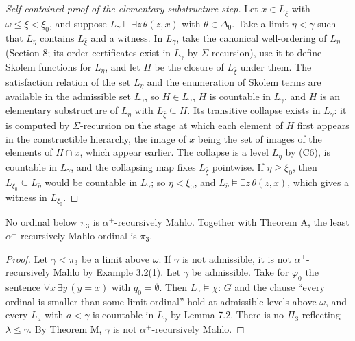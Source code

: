 \documentclass[11pt]{article}
\begin{document}
\begin{proof}[Self-contained proof of the elementary substructure step]
Let $x \in L_{\bar{\xi}}$ with $\omega \le \bar{\xi} < \xi_0$, and suppose $L_{\gamma} \models \exists z\, \theta(z, x)$
with $\theta \in \Delta_0$. Take a limit $\eta < \gamma$ such that $L_{\eta}$ contains $L_{\bar{\xi}}$ and a witness. In
$L_{\gamma}$, take the canonical well-ordering of $L_{\eta}$ (Section 8; its order certificates exist in
$L_{\gamma}$ by $\Sigma$-recursion), use it to define Skolem functions for $L_{\eta}$, and let $H$ be the
closure of $L_{\bar{\xi}}$ under them. The satisfaction relation of the set $L_{\eta}$ and the enumeration of Skolem
terms are available in the admissible set $L_{\gamma}$, so $H \in L_{\gamma}$, $H$ is countable in $L_{\gamma}$, and $H$
is an elementary substructure of $L_{\eta}$ with $L_{\bar{\xi}} \subseteq H$. Its transitive collapse exists in
$L_{\gamma}$: it is computed by $\Sigma$-recursion on the stage at which each element of $H$ first appears in the
constructible hierarchy, the image of $x$ being the set of images of the elements of $H \cap x$, which appear
earlier. The collapse is a level $L_{\bar{\eta}}$ by (C6), is countable in $L_{\gamma}$, and the collapsing map fixes
$L_{\bar{\xi}}$ pointwise. If $\bar{\eta} \ge \xi_0$, then $L_{\xi_0} \subseteq L_{\bar{\eta}}$ would be countable in
$L_{\gamma}$; so $\bar{\eta} < \xi_0$, and $L_{\bar{\eta}} \models \exists z\, \theta(z, x)$, which gives a witness in
$L_{\xi_0}$.
\end{proof}

\begin{statement} No ordinal below $\pi_3$ is $\alpha^+$-recursively Mahlo. Together with Theorem A, the least $\alpha^+$-recursively Mahlo ordinal is
$\pi_3$.
\end{statement}

\begin{proof}
Let $\gamma < \pi_3$ be a limit above $\omega$. If $\gamma$ is not admissible, it is not $\alpha^+$-recursively Mahlo by Example 3.2(1). Let
$\gamma$ be admissible. Take for $\varphi_0$ the sentence $\forall x\, \exists y\, (y = x)$ with
$q_0 = \emptyset$. Then $L_{\gamma} \models \chi$: $G$ and the clause ``every ordinal is smaller than some limit ordinal'' hold at admissible levels above $\omega$,
and every $L_a$ with $a < \gamma$ is countable in $L_{\gamma}$ by Lemma 7.2. There is no $\Pi_3$-reflecting $\lambda \le \gamma$. By Theorem M, $\gamma$ is
not $\alpha^+$-recursively Mahlo.
\end{proof}
\end{document}
